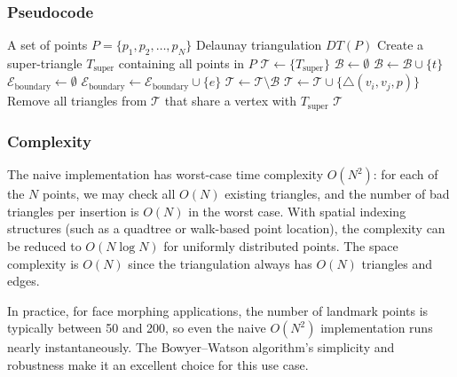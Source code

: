\subsubsection*{Pseudocode}

\begin{algorithm}[H]
\caption{Bowyer--Watson Delaunay Triangulation}
\label{alg:bowyer-watson}
\begin{algorithmic}[1]
\Require A set of points $P = \{p_1, p_2, \dots, p_N\}$
\Ensure Delaunay triangulation $DT(P)$
\State Create a super-triangle $T_{\text{super}}$ containing all points in $P$
\State $\mathcal{T} \gets \{T_{\text{super}}\}$ 
    \State $\mathcal{B} \gets \emptyset$ 
            \State $\mathcal{B} \gets \mathcal{B} \cup \{t\}$
        \EndIf
    \EndFor
    \State $\mathcal{E}_{\text{boundary}} \gets \emptyset$ 
                \State $\mathcal{E}_{\text{boundary}} \gets \mathcal{E}_{\text{boundary}} \cup \{e\}$
            \EndIf
        \EndFor
    \EndFor
    \State $\mathcal{T} \gets \mathcal{T} \setminus \mathcal{B}$
        \State $\mathcal{T} \gets \mathcal{T} \cup \{\triangle(v_i, v_j, p)\}$
    \EndFor
\EndFor
\State Remove all triangles from $\mathcal{T}$ that share a vertex with $T_{\text{super}}$
\State \Return $\mathcal{T}$
\end{algorithmic}
\end{algorithm}

\subsubsection*{Complexity}

The naive implementation has worst-case time complexity $O(N^2)$: for each
of the $N$ points, we may check all $O(N)$ existing triangles, and the number
of bad triangles per insertion is $O(N)$ in the worst case.  With spatial
indexing structures (such as a quadtree or walk-based point location), the
complexity can be reduced to $O(N \log N)$ for uniformly distributed points.
The space complexity is $O(N)$ since the triangulation always has $O(N)$
triangles and edges.

\begin{remark}
    In practice, for face morphing applications, the number of landmark points
    is typically between 50 and 200, so even the naive $O(N^2)$ implementation
    runs nearly instantaneously.  The Bowyer--Watson algorithm's simplicity and
    robustness make it an excellent choice for this use case.
\end{remark}

